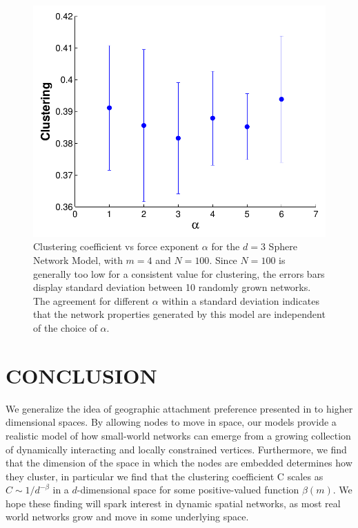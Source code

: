 \documentclass[aps,pre,manuscript,superscriptaddress,amsmath,amssymb,nofootinbib]{revtex4-1}
\begin{document}
\begin{figure}
\includegraphics[width=\linewidth]{figures/figCvsAlpha.pdf}
\caption{\label{forcelaw}Clustering coefficient vs force exponent $\alpha$ for the $d = 3$ Sphere Network Model, with $m=4$ and $N = 100$. Since $N = 100$ is generally too low for a consistent value for clustering, the errors bars display standard deviation between 10 randomly grown networks. The agreement for different $\alpha$ within a standard deviation indicates that the network properties generated by this model are independent of the choice of $\alpha$.}
\end{figure}

\section{CONCLUSION}
We generalize the idea of geographic attachment preference presented in \cite{ozik2004} to higher dimensional spaces.
By allowing nodes to move in space, our models provide a realistic model of how small-world networks can emerge from a growing collection of dynamically interacting and locally constrained vertices.  
Furthermore, we find that the dimension of the space in which the nodes are embedded determines how they cluster, in particular we find that the clustering coefficient C scales as $C \sim 1/d^{-\beta}$ in a $d$-dimensional space for some positive-valued function $\beta(m)$.
We hope these finding will spark interest in dynamic spatial networks, as most real world networks grow and move in some underlying space.

\nocite{newmanreview}

\end{document}
